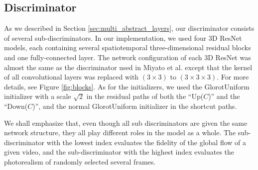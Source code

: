 \documentclass[twocolumn]{svjour3}
\def\Fig#1{Figure \ref{fig:#1}}
\def\Sec#1{Section \ref{sec:#1}}
\begin{document}
\subsection{Discriminator}
\label{sec:discriminator}
As we described in \Sec{multi_abstract_layers}, our discriminator consists of
several sub-discriminators. In our implementation, we used four 3D ResNet models, each containing several spatiotemporal three-dimensional residual blocks \cite{Hara2018,He2016} and one fully-connected layer.
The network configuration of each 3D ResNet was almost the same as the discriminator used in Miyato et al. \cite{Miyato2018} except that the kernel of all convolutional layers was replaced with $(3 \times 3)$ to $(3 \times 3 \times 3)$. For more details, see \Fig{blocks}.
As for the initializers, we used the GlorotUniform initializer \cite{Glorot2010} with a scale $\sqrt{2}$ in the residual paths of both the ``Up($C$)'' and the ``Down($C$)'', and the normal GlorotUniform initializer in the shortcut paths.

We shall emphasize that, even though all sub\discretionary{-}{-}{-}
discriminators are given the same network structure, they all play different roles in the model as a whole.
The sub-discriminator with the lowest index evaluates the fidelity of the global flow of a given video, and the sub-discriminator with the highest index evaluates the photorealism of randomly selected several frames.
\end{document}
